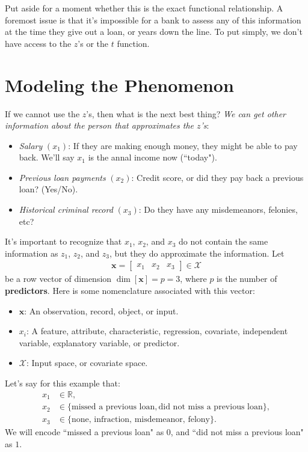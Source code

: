 \documentclass[12pt, a4paper]{article}
\begin{document}
	Put aside for a moment whether this is the exact functional relationship. A foremost
	issue is that it's impossible for a bank to assess any of this information at the time they
	give out a loan, or years down the line. To put simply, we don't have access to the $z$'s
	or the $t$ function.
	\section*{Modeling the Phenomenon}
	If we cannot use the $z$'s, then what is the next best thing? \emph{We can get other information about
	the person that approximates the $z$'s}:
	\begin{itemize}
		\item \emph{Salary} $(x_1)$: If they are making enough money, they might be able
		to pay back. We'll say $x_1$ is the annal income now (``today").
		\item \emph{Previous loan payments} $(x_2)$: Credit score, or did they pay back a
		previous loan? (Yes/No).
		\item \emph{Historical criminal record} $(x_3)$: Do they have any misdemeanors, felonies,
		etc?
	\end{itemize}
	It's important to recognize that $x_1$, $x_2$, and $x_3$ do not contain the same information
	as $z_1$, $z_2$, and $z_3$, but they do approximate the information. Let
	\begin{align*}
		\mathbf{x} = \begin{bmatrix}
			x_1 & x_2 & x_3
		\end{bmatrix}
		\in \mathcal{X}
	\end{align*}
	be a row vector of dimension $\dim [\mathbf{x}] = p = 3$, where $p$ is the number of
	\textbf{predictors}. Here is some nomenclature associated with this vector:
	\begin{itemize}
		\item $\mathbf{x}$: An observation, record, object, or input.
		\item $x_i$: A feature, attribute, characteristic, regression, covariate, independent variable,
		explanatory variable, or predictor.
		\item $\mathcal{X}$: Input space, or covariate space.
	\end{itemize}
	Let's say for this example that:
	\begin{align*}
		x_1&\in\mathbb{R},\\
		x_2&\in\{\text{missed a previous loan}, \text{did not miss a previous loan}\},\\
		x_3&\in\{\text{none, infraction, misdemeanor, felony}\}.
	\end{align*}
	We will encode ``missed a previous loan" as $0$, and ``did not miss a previous loan" as $1$.
\end{document}
